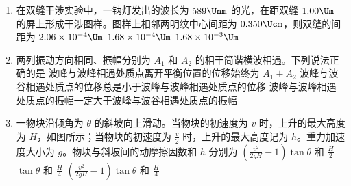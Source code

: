 \documentclass[\gkver]{gaokaozhenti}
\begin{document}
\begin{enumerate}
\item
在双缝干涉实验中，一钠灯发出的波长为 $589\Unm$ 的光，在距双缝 $1.00\Um$ 的屏上形成干涉图样。图样上相邻两明纹中心间距为 $0.350\Ucm$，则双缝的间距为
{$2.06\times10^{-4}\Um$}
{$1.68\times10^{-4}\Um$}
{$1.68\times10^{-3}\Um$}

\item
两列振动方向相同、振幅分别为 $A_1$ 和 $A_2$ 的相干简谐横波相遇。下列说法正确的是
{波峰与波峰相遇处质点离开平衡位置的位移始终为 $A_1+A_2$}
{波峰与波谷相遇处质点的位移总是小于波峰与波峰相遇处质点的位移}
{波峰与波峰相遇处质点的振幅一定大于波峰与波谷相遇处质点的振幅}

\item
一物块沿倾角为 $\theta$ 的斜坡向上滑动。当物块的初速度为 $v$ 时，上升的最大高度为 $H$，如图所示；当物块的初速度为 $\frac{v}{2}$ 时，上升的最大高度记为 $h$。重力加速度大小为 $g$。物块与斜坡间的动摩擦因数和 $h$ 分别为
{$\left(\frac{v^2}{2gH}-1\right)\tan\theta$ 和 $\frac{H}{2}$}
{$\tan\theta$ 和 $\frac{H}{4}$}
{$\left(\frac{v^2}{2gH}-1\right)\tan\theta$ 和 $\frac{H}{4}$}


\end{enumerate}
\end{document}
